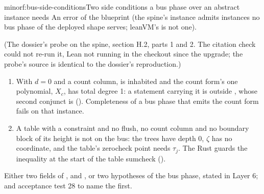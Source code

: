 \begin{finding}{minor}{f:bus-side-conditions}{Two side conditions a bus phase over an abstract instance needs}
 An error of the blueprint (the spine's instance admits instances no bus
phase of the deployed shape serves; leanVM's is not one).

 (The dossier's probe on the spine, section H.2, parts 1 and 2. The citation
check could not re-run it, Lean not running in the checkout since the upgrade; the probe's source
is identical to the dossier's reproduction.)
\begin{enumerate}
\item With $d = 0$ and a count column,  is inhabited and the count form's one
  polynomial, $X_c$, has total degree 1: a statement carrying it is outside , whose
  second conjunct is  (). Completeness of a
  bus phase that emits the count form fails on that instance.
\item A table with a constraint and no flush, no count column and no boundary block of its height
  is not on the bus: the trees have depth 0, $ζ$ has no coordinate, and the table's zerocheck
  point needs $τ_j$. The Rust guards the inequality at the start of the table sumcheck
  ().
\end{enumerate}

 Either two fields of ,  and
, or two hypotheses of the bus
phase, stated in Layer 6; and acceptance test 28 to name the first.
\end{finding}

